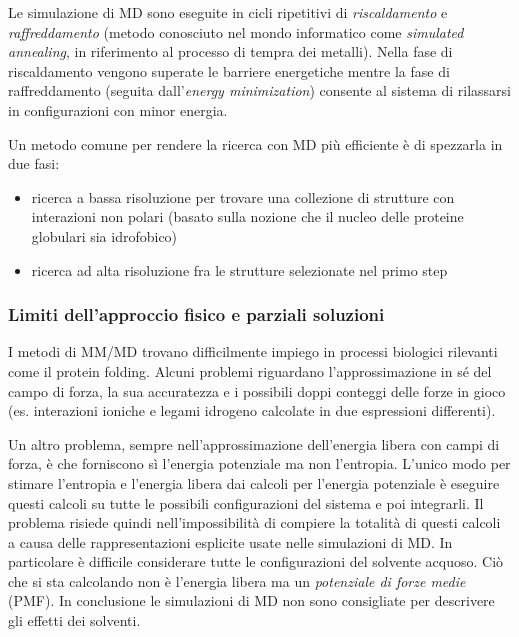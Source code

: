 {\par Le simulazione di MD sono eseguite in cicli ripetitivi di \textit{riscaldamento} e \textit{raffreddamento} (metodo conosciuto nel mondo informatico come \textit{simulated annealing}, in riferimento al processo di tempra dei metalli). Nella fase di riscaldamento vengono superate le barriere energetiche mentre la fase di raffreddamento (seguita dall'\textit{energy minimization}) consente al sistema di rilassarsi in configurazioni con minor energia.

\par Un metodo comune per rendere la ricerca con MD più efficiente è di spezzarla in due fasi:
\begin{itemize}
	\item ricerca a bassa risoluzione per trovare una collezione di strutture con interazioni non polari (basato sulla nozione che il nucleo delle proteine globulari sia idrofobico)
	\item ricerca ad alta risoluzione fra le strutture selezionate nel primo step
\end{itemize}

\subsubsection{Limiti dell'approccio fisico e parziali soluzioni}
I metodi di MM/MD trovano difficilmente impiego in processi biologici rilevanti come il protein folding.
Alcuni problemi riguardano l'approssimazione in sé del campo di forza, la sua accuratezza e i possibili doppi conteggi delle forze in gioco (es. interazioni ioniche e legami idrogeno calcolate in due espressioni differenti). 

\par Un altro problema, sempre nell'approssimazione dell'energia libera con campi di forza, è che forniscono sì l'energia potenziale ma non l'entropia. L'unico modo per stimare l'entropia e l'energia libera dai calcoli per l'energia potenziale è eseguire questi calcoli su tutte le possibili configurazioni del sistema e poi integrarli. Il problema risiede quindi nell'impossibilità di compiere la totalità di questi calcoli a causa delle rappresentazioni esplicite usate nelle simulazioni di MD. In particolare è difficile considerare tutte le configurazioni del solvente acquoso. Ciò che si sta calcolando non è l'energia libera ma un \textit{potenziale di forze medie} (PMF). In conclusione le simulazioni di MD non sono consigliate per descrivere gli effetti dei solventi.

}
